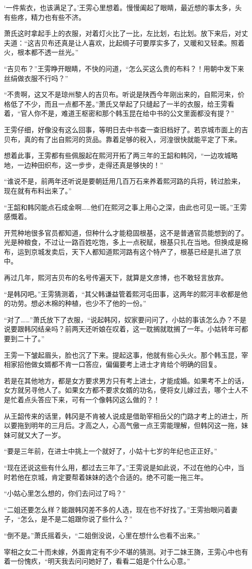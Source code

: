 ‘一件紫衣，也该满足了。’王雱心里想着。慢慢阖起了眼睛，最近想的事太多，头有些疼，精力也有些不济。

萧氏这时拿起手上的衣服，对着灯火比了一比，左比划，右比划。放下来后，对丈夫道：“这吉贝布还真是让人喜欢，比起绸子可要厚实多了，又暖和又轻柔。照着火，根本都不透一丝光。”

“吉贝布？”王雱睁开眼睛，不快的问道，“怎么买这么贵的布料？！用朝中发下来丝绢做衣服不行吗？”

“不贵啊，这又不是琼州黎人的吉贝布。听说是陕西今年刚出来的，自熙河来，价格低了不少，而且一点都不差。”萧氏又举起了只缝起了一半的衣服，给王雱看着，“官人你不是，难道王枢密和那个韩玉昆在给中书的公文里面都没有提？”

王雱仔细，好像没有这么回事，等明日去中书查一查旧档好了。若京城市面上的吉贝布，真的有了出自熙河的货品。靠着足够的税入，河湟很快就能平定了下来。

想着此事，王雱都有些佩服起在熙河开拓了两三年的王韶和韩冈，“一边攻城略地，一边种田织布，这一步步，走得还真是够快的！”

“谁说不是，前两年还听说是要朝廷用几百万石来养着熙河路的兵将，转过脸来，现在就有布料出来了。”

“王韶和韩冈能点石成金啊……他们在熙河之事上用心之深，由此也可见一斑。”王雱感慨着。

开荒种地很多官员都知道，但种什么才能稳固根基，这不是普通官员能想到的了。光是种粮食，不过让一路百姓吃饱，多上一点税赋，根基只扎在当地。但换成是棉布，运到京城发卖后，天下人都知道熙河路有这个特产了，根基已经是扎进了京中。

再过几年，熙河吉贝布的名号传遍天下，就算是文彦博，也不敢轻言放弃。

“是韩冈吧。”王雱猜测着，“其父韩谦益管着熙河屯田事，这两年的熙河丰收都是他的功劳。想必木棉的种植，也少不了他的一份。”

“对了……”萧氏放下了衣服，“说起韩冈，奴家要问问了，小姑的事该怎么办？不是说要跟韩冈结亲吗？前两天还听娘在叹着，这一耽搁就耽搁了一年。小姑转年可都要到二十了。”

王雱一下皱起眉头，脸也沉了下来。提起这事，他就有些心头火。那个韩玉昆，宰相家招他做女婿都不肯一口答应，偏偏要考上进士才肯给个明确的回复。

若是在其他地方，都是女方要求男方只有考上进士，才能成婚。如果考不上的话，女方就另寻他人了。如果女方都不要求女婿的功名，便将女儿嫁过去，哪个士人不是忙着点头答应下来，可有一个像韩冈这么做的？！

从王韶传来的话里，韩冈是不肯被人说成是借助宰相岳父的门路才考上的进士，所以要拖到明年的三月后。才高之人，心高气傲一点王雱能理解，但韩冈这一拖，妹妹可就又大了一岁。

“要是三年前，在进士中挑上一个就好了，小姑十七岁的年纪也正正好。”

“现在还说这些有什么用，都过去三年了。”王雱说是如此说，不过在他的心中，当时若他在京城，肯定要帮着妹妹的选个合适的。绝不可能一拖三年。

“小姑心里怎么想的，你们去问过了吗？”

“二姐还要怎么样？能跟韩冈差不多的人选，现在也不好找了。”王雱抬眼问着妻子，“怎么，是不是二姐跟你说了些什么？”

“倒不是。”萧氏摇着头，“二姐倒没说，心里在想什么也看不出来。”

宰相之女二十而未嫁，外面肯定有不少不堪的猜测。对于二妹王旖，王雱心中也有着一份愧疚，“明天我去问问她好了，看看二姐是个什么心意。”

